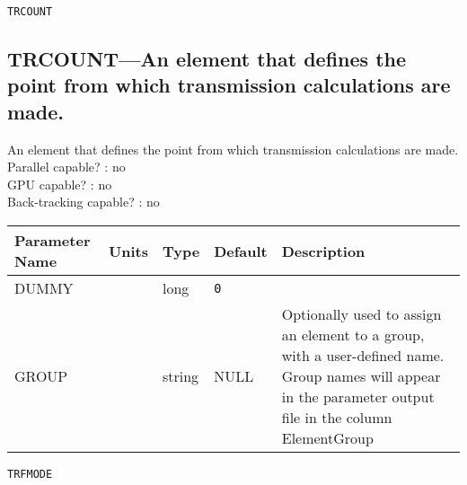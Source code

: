 \newpage
\begin{center}{\Large\verb|TRCOUNT|}\end{center}
\subsection{TRCOUNT---An element that defines the point from which transmission calculations are made.}
An element that defines the point from which transmission calculations are made.
\\
Parallel capable? : no\\
GPU capable? : no\\
Back-tracking capable? : no\\
\begin{tabular}{|l|l|l|l|p{\descwidth}|} \hline
Parameter Name & Units & Type & Default & Description \\ \hline 
DUMMY &  & long &  \verb|0| & \\ \hline 
GROUP &  & string & NULL & Optionally used to assign an element to a group, with a user-defined name.  Group names will appear in the parameter output file in the column ElementGroup  \\ \hline 
\end{tabular}

\newpage
\begin{center}{\Large\verb|TRFMODE|}\end{center}
